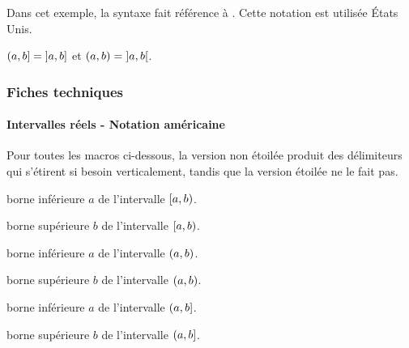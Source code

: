 \documentclass[12pt,a4paper]{article}
\begin{document}
Dans cet exemple, la syntaxe fait référence à . Cette notation est utilisée États Unis.

\begin{latexex}
$\intervalPC{a}{b} = \intervalOC{a}{b}$
et
$\intervalP{a}{b} = \intervalO{a}{b}$.
\end{latexex}




\subsubsection{Fiches techniques}

\paragraph{Intervalles réels - Notation américaine}

Pour toutes les macros ci-dessous, la version non étoilée produit des délimiteurs qui s'étirent si besoin verticalement, tandis que la version étoilée ne le fait pas.


\separation





 borne inférieure $a$ de l'intervalle $\intervalCP{a}{b}$.

 borne supérieure $b$ de l'intervalle $\intervalCP{a}{b}$.


\separation




 borne inférieure $a$ de l'intervalle $\intervalP{a}{b}$.

 borne supérieure $b$ de l'intervalle $\intervalP{a}{b}$.


\separation




 borne inférieure $a$ de l'intervalle $\intervalPC{a}{b}$.

 borne supérieure $b$ de l'intervalle $\intervalPC{a}{b}$.



\end{document}
